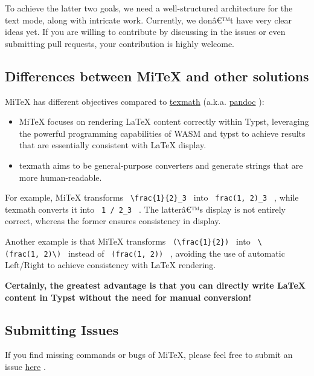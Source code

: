 To achieve the latter two goals, we need a well-structured architecture
for the text mode, along with intricate work. Currently, we donâ€™t have
very clear ideas yet. If you are willing to contribute by discussing in
the issues or even submitting pull requests, your contribution is highly
welcome.

\subsection{Differences between MiTeX and other
solutions}\label{differences-between-mitex-and-other-solutions}

MiTeX has different objectives compared to
\href{https://github.com/jgm/texmath}{texmath} (a.k.a.
\href{https://pandoc.org/}{pandoc} ):

\begin{itemize}
\tightlist
\item
  MiTeX focuses on rendering LaTeX content correctly within Typst,
  leveraging the powerful programming capabilities of WASM and typst to
  achieve results that are essentially consistent with LaTeX display.
\item
  texmath aims to be general-purpose converters and generate strings
  that are more human-readable.
\end{itemize}

For example, MiTeX transforms
\texttt{\ \textbackslash{}frac\{1\}\{2\}\_3\ } into
\texttt{\ frac(1,\ 2)\_3\ } , while texmath converts it into
\texttt{\ 1\ /\ 2\_3\ } . The latterâ€™s display is not entirely
correct, whereas the former ensures consistency in display.

Another example is that MiTeX transforms
\texttt{\ (\textbackslash{}frac\{1\}\{2\})\ } into
\texttt{\ \textbackslash{}(frac(1,\ 2)\textbackslash{})\ } instead of
\texttt{\ (frac(1,\ 2))\ } , avoiding the use of automatic Left/Right to
achieve consistency with LaTeX rendering.

\textbf{Certainly, the greatest advantage is that you can directly write
LaTeX content in Typst without the need for manual conversion!}

\subsection{Submitting Issues}\label{submitting-issues}

If you find missing commands or bugs of MiTeX, please feel free to
submit an issue \href{https://github.com/mitex-rs/mitex/issues}{here} .

